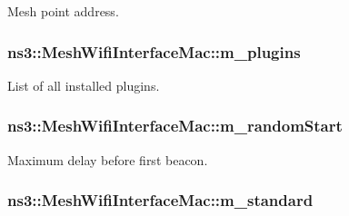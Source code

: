 Mesh point address. 

\subsubsection[{\texorpdfstring{m\+\_\+plugins}{m_plugins}}]{ ns3\+::\+Mesh\+Wifi\+Interface\+Mac\+::m\+\_\+plugins\hspace{0.3cm}{\ttfamily [private]}}\hypertarget{classns3_1_1MeshWifiInterfaceMac_ace0a54623c4daa3e9fc7f5570a84683c}{}\label{classns3_1_1MeshWifiInterfaceMac_ace0a54623c4daa3e9fc7f5570a84683c}


List of all installed plugins. 

\subsubsection[{\texorpdfstring{m\+\_\+random\+Start}{m_randomStart}}]{ ns3\+::\+Mesh\+Wifi\+Interface\+Mac\+::m\+\_\+random\+Start\hspace{0.3cm}{\ttfamily [private]}}\hypertarget{classns3_1_1MeshWifiInterfaceMac_ac5bcacc9a26b26fade1fd72e980ebd68}{}\label{classns3_1_1MeshWifiInterfaceMac_ac5bcacc9a26b26fade1fd72e980ebd68}


Maximum delay before first beacon. 

\subsubsection[{\texorpdfstring{m\+\_\+standard}{m_standard}}]{ ns3\+::\+Mesh\+Wifi\+Interface\+Mac\+::m\+\_\+standard\hspace{0.3cm}{\ttfamily [private]}}\hypertarget{classns3_1_1MeshWifiInterfaceMac_ae9c25902a995c9cf053d4cccd63e6e4c}{}\label{classns3_1_1MeshWifiInterfaceMac_ae9c25902a995c9cf053d4cccd63e6e4c}


